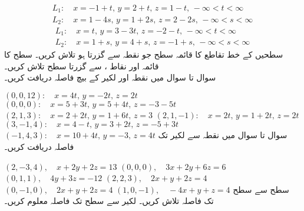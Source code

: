 \begin{align*}
L_1:\quad x=-1+t,\,y=2+t,\,z=1-t,\,-\infty<t<\infty\\
L_2:\quad x=1-4s,\,y=1+2s,\,z=2-2s,\,-\infty<s<\infty
\end{align*}
\begin{align*}
L_1:\quad x=t,\,y=3-3t,\,z=-2-t,\,-\infty<t<\infty\\
L_2:\quad x=1+s,\,y=4+s,\,z=-1+s,\,-\infty<s<\infty
\end{align*}
سطحیں   کے خط تقاطع  کا قائمہ سطح جو نقطہ  سے گزرتا ہو  تلاش کریں۔
سطح  کا قائمہ اور نقاط ،  سے گزرتا سطح تلاش کریں۔
\\
سوال  تا سوال  میں نقطہ اور لکیر کے بیچ فاصلہ دریافت کریں۔

$(0,0,12):\quad x=4t,\,y=-2t,\,z=2t$
$(0,0,0):\quad x=5+3t,\,y=5+4t,\,z=-3-5t$
$(2,1,3):\quad x=2+2t,\,y=1+6t,\,z=3$
$(2,1,-1):\quad x=2t,\,y=1+2t,\,z=2t$
$(3,-1,4):\quad x=4-t,\,y=3+2t,\,z=-5+3t$
$(-1,4,3):\quad x=10+4t,\,y=-3,\,z=4t$
سوال  تا سوال  میں نقطہ سے لکیر تک فاصلہ  دریافت کریں۔

$(2,-3,4),\quad x+2y+2z=13$
$(0,0,0),\quad 3x+2y+6z=6$
$(0,1,1),\quad 4y+3z=-12$
$(2,2,3),\quad 2x+y+2z=4$
$(0,-1,0),\quad 2x+y+2z=4$
$(1,0,-1),\quad -4x+y+z=4$
سطح  سے سطح  تک فاصلہ تلاش کریں۔
لکیر  سے سطح  تک فاصلہ معلوم کریں۔

